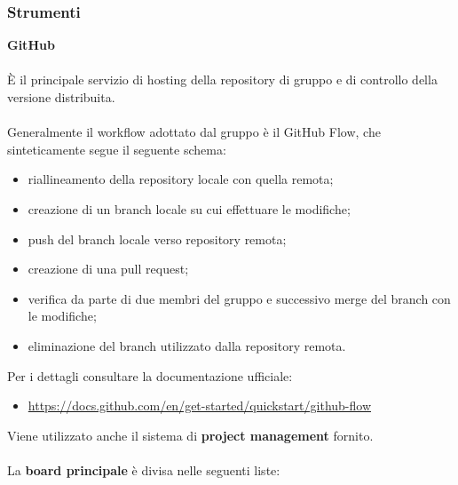 \subsubsection{Strumenti}
\textbf{GitHub}\\\\
È il principale servizio di hosting della repository di gruppo e di controllo della versione distribuita. 
\\\\
Generalmente il workflow adottato dal gruppo è il GitHub Flow, che sinteticamente segue il seguente schema:
\begin{itemize}
  \item riallineamento della repository locale con quella remota;
  \item creazione di un branch locale su cui effettuare le modifiche;
  \item push del branch locale verso repository remota;
  \item creazione di una pull request;
  \item verifica da parte di due membri del gruppo e successivo merge del branch con le modifiche;
  \item eliminazione del branch utilizzato dalla repository remota.
\end{itemize}
Per i dettagli consultare la documentazione ufficiale: 
\begin{itemize}
  \item \underline{https://docs.github.com/en/get-started/quickstart/github-flow}
\end{itemize}
\medskip
Viene utilizzato anche il sistema di \textbf{project management} fornito.\\\\
La \textbf{board principale} è divisa nelle seguenti liste:
